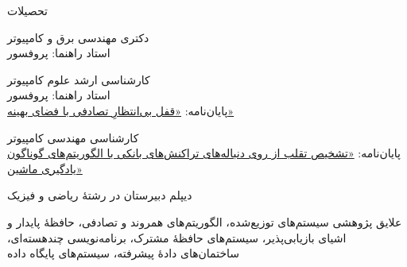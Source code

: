 \documentclass[11pt]{article}
\begin{document}

\begin{faSection}{تحصیلات}

دکتری مهندسی برق و کامپیوتر\\
استاد راهنما: پروفسور 

\vspace{0.5em}
کارشناسی ارشد علوم کامپیوتر\\
استاد راهنما: پروفسور \\
پایان‌نامه: \href{https://ucalgary.scholaris.ca/bitstreams/5ae5cf8f-5009-4db3-b91e-d3dbb679b5bf/download}{«قفل بی‌انتظارِ تصادفی با فضای بهینه»}

\vspace{0.5em}
کارشناسی مهندسی کامپیوتر\\
پایان‌نامه: \href{https://github.com/kahbodaeini/Fraud-Detection}{«تشخیص تقلب از روی دنباله‌های تراکنش‌های بانکی با الگوریتم‌های گوناگون یادگیری ماشین»}

\vspace{0.5em}
دیپلم دبیرستان در رشتۀ ریاضی و فیزیک

\end{faSection}

\begin{faSection}{علایق پژوهشی}
سیستم‌های توزیع‌شده، الگوریتم‌های همروند و تصادفی، حافظۀ پایدار و اشیای بازیابی‌پذیر،
سیستم‌های حافظۀ مشترک، برنامه‌نویسی چندهسته‌ای، ساختمان‌های دادۀ پیشرفته، سیستم‌های پایگاه داده
\end{faSection}
\end{document}
